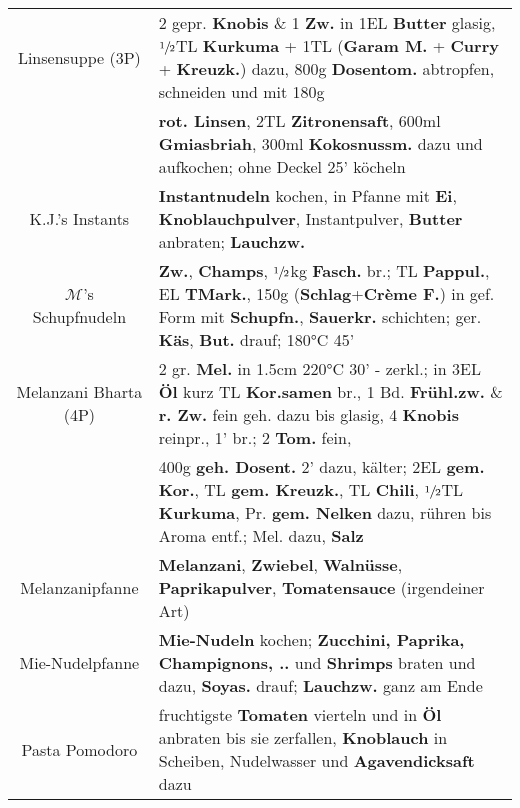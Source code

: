 \documentclass{article}
\begin{document}
\begin{tabular}{c|l}
        Linsensuppe {\scriptsize(3P)}& 2 gepr. \textbf{Knobis} \& 1 \textbf{Zw.} in 1EL \textbf{Butter} glasig, $\sfrac{1}{2}$TL \textbf{Kurkuma} + 1TL (\textbf{Garam M.} + \textbf{Curry} + \textbf{Kreuzk.}) dazu, 800g \textbf{Dosentom.} abtropfen, schneiden und mit 180g\\&
        \textbf{rot. Linsen}, 2TL \textbf{Zitronensaft}, 600ml \textbf{Gmiasbriah}, 300ml \textbf{Kokosnussm.} dazu und aufkochen; ohne Deckel 25' köcheln\\\hline

        K.J.'s Instants & \textbf{Instantnudeln} kochen, in Pfanne mit \textbf{Ei}, \textbf{Knoblauchpulver}, Instantpulver, \textbf{Butter} anbraten; \textbf{Lauchzw.}\\\hline
		
        $\mathcal{M}$'s Schupfnudeln&\textbf{Zw.}, \textbf{Champs}, $\sfrac{1}{2}$kg \textbf{Fasch.} br.; TL \textbf{Pappul.}, EL \textbf{TMark.}, 150g (\textbf{Schlag}+\textbf{Crème F.}) in gef. Form mit \textbf{Schupfn.}, \textbf{Sauerkr.} schichten;
        ger. \textbf{Käs}, \textbf{But.} drauf; 180°C 45'
		\\\hline

        Melanzani Bharta {\scriptsize(4P)} & 2 gr. \textbf{Mel.} in 1.5cm 220°C 30' - zerkl.; in 3EL \textbf{Öl} kurz TL \textbf{Kor.samen} br., 1 Bd. \textbf{Frühl.zw.} \& \textbf{r. Zw.} fein geh. dazu bis glasig, 4 \textbf{Knobis} reinpr., 1’ br.; 2 \textbf{Tom.} fein,\\&
        400g \textbf{geh. Dosent.} 2' dazu, kälter; 2EL \textbf{gem. Kor.}, TL \textbf{gem. Kreuzk.}, TL \textbf{Chili}, $\sfrac{1}{2}$TL \textbf{Kurkuma}, Pr. \textbf{gem. Nelken} dazu, rühren bis Aroma entf.; Mel. dazu, \textbf{Salz}\\\hline
		
        Melanzanipfanne & \textbf{Melanzani}, \textbf{Zwiebel}, \textbf{Walnüsse}, \textbf{Paprikapulver}, \textbf{Tomatensauce} (irgendeiner Art) \\\hline

		Mie-Nudelpfanne&\textbf{Mie-Nudeln} kochen; \textbf{Zucchini, Paprika, Champignons, ..} und \textbf{Shrimps} braten und dazu, \textbf{Soyas.} drauf; \textbf{Lauchzw.} ganz am Ende\\\hline
		
        Pasta Pomodoro & fruchtigste \textbf{Tomaten} vierteln und in \textbf{Öl} anbraten bis sie zerfallen, \textbf{Knoblauch} in Scheiben, Nudelwasser und \textbf{Agavendicksaft} dazu \\\hline
        

\end{tabular}
\end{document}
